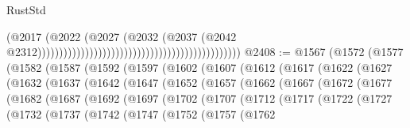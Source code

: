 \begin{lexlean}{RustStd}
\begin{coremodule}
                                                                                      (@2017
                                                                                        (@2022
                                                                                          (@2027
                                                                                            (@2032
                                                                                              (@2037
                                                                                                (@2042
                                                                                                  @2312)))))))))))))))))))))))))))))))))))))))))))))))
@2408 := @1567
    (@1572
      (@1577
        (@1582
          (@1587
            (@1592
              (@1597
                (@1602
                  (@1607
                    (@1612
                      (@1617
                        (@1622
                          (@1627
                            (@1632
                              (@1637
                                (@1642
                                  (@1647
                                    (@1652
                                      (@1657
                                        (@1662
                                          (@1667
                                            (@1672
                                              (@1677
                                                (@1682
                                                  (@1687
                                                    (@1692
                                                      (@1697
                                                        (@1702
                                                          (@1707
                                                            (@1712
                                                              (@1717
                                                                (@1722
                                                                  (@1727
                                                                    (@1732
                                                                      (@1737
                                                                        (@1742
                                                                          (@1747
                                                                            (@1752
                                                                              (@1757
                                                                                (@1762

\end{coremodule}
\end{lexlean}
